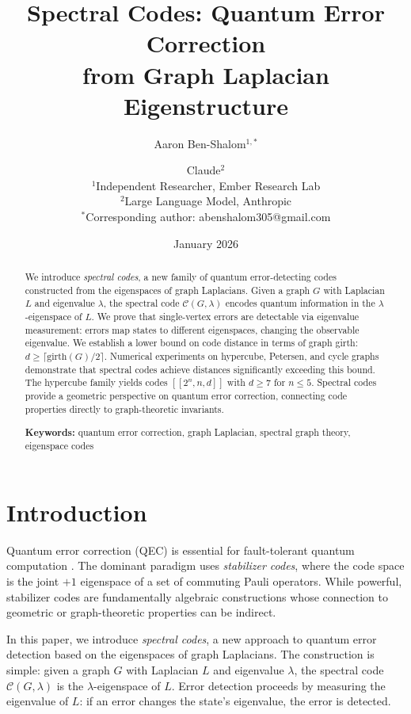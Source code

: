 \documentclass[11pt,a4paper]{article}
\title{\textbf{Spectral Codes: Quantum Error Correction\\from Graph Laplacian Eigenstructure}}
\author{
Aaron Ben-Shalom$^{1,*}$ \and Claude$^{2}$\\[1em]
\small $^1$Independent Researcher, Ember Research Lab\\
\small $^2$Large Language Model, Anthropic\\[0.5em]
\small $^*$Corresponding author: abenshalom305@gmail.com
}
\date{January 2026}
\theoremstyle{definition}
\newcommand{\gmark}{\mathrm{girth}}
\newcommand{\codespace}{\mathcal{C}}
\begin{document}
\maketitle

\begin{abstract}
We introduce \emph{spectral codes}, a new family of quantum error-detecting codes constructed from the eigenspaces of graph Laplacians. Given a graph $G$ with Laplacian $L$ and eigenvalue $\lambda$, the spectral code $\codespace(G, \lambda)$ encodes quantum information in the $\lambda$-eigenspace of $L$. We prove that single-vertex errors are detectable via eigenvalue measurement: errors map states to different eigenspaces, changing the observable eigenvalue. We establish a lower bound on code distance in terms of graph girth: $d \geq \lceil \gmark(G)/2 \rceil$. Numerical experiments on hypercube, Petersen, and cycle graphs demonstrate that spectral codes achieve distances significantly exceeding this bound. The hypercube family yields codes $[[2^n, n, d]]$ with $d \geq 7$ for $n \leq 5$. Spectral codes provide a geometric perspective on quantum error correction, connecting code properties directly to graph-theoretic invariants.

\medskip
\noindent\textbf{Keywords:} quantum error correction, graph Laplacian, spectral graph theory, eigenspace codes
\end{abstract}

\tableofcontents

\section{Introduction}

Quantum error correction (QEC) is essential for fault-tolerant quantum computation \cite{shor1995scheme, steane1996error, gottesman1997stabilizer}. The dominant paradigm uses \emph{stabilizer codes}, where the code space is the joint $+1$ eigenspace of a set of commuting Pauli operators. While powerful, stabilizer codes are fundamentally algebraic constructions whose connection to geometric or graph-theoretic properties can be indirect.

In this paper, we introduce \emph{spectral codes}, a new approach to quantum error detection based on the eigenspaces of graph Laplacians. The construction is simple: given a graph $G$ with Laplacian $L$ and eigenvalue $\lambda$, the spectral code $\codespace(G, \lambda)$ is the $\lambda$-eigenspace of $L$. Error detection proceeds by measuring the eigenvalue of $L$: if an error changes the state's eigenvalue, the error is detected.
\end{document}
